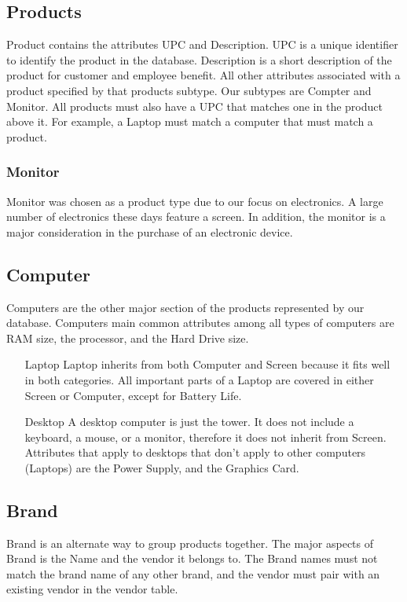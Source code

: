 \documentclass{article}
\begin{document}
		\subsection{Products}
			Product contains the attributes UPC and Description. UPC is a unique
			identifier to identify the product in the database. Description is a short
			description of the product for customer and employee benefit. All other
			attributes associated with a product specified by that products subtype.
			Our subtypes are Compter and Monitor. All products must also have a UPC that 
			matches one in the product above it. For example, a Laptop must match a 
			computer that must match a product.

			\subsubsection{Monitor}
				Monitor was chosen as a product type due to our focus on electronics.  A
				large number of electronics these days feature a screen. In addition, the
				monitor is a major consideration in the purchase of an electronic device.

			\subsection{Computer}
				Computers are the other major section of the products represented by our
				database. Computers main common attributes among all types of computers
				are RAM size, the processor, and the Hard Drive size. 
				\begin{itemize}
				
					\item [Laptop] Laptop inherits from both Computer and Screen because 
					it fits well in both categories. All important parts of a Laptop are 
					covered in either Screen or Computer, except for Battery Life.
					
					\item [Desktop]  A desktop computer is just the tower. It does not 
					include a keyboard, a mouse, or a monitor, therefore it does not 
					inherit from Screen. Attributes that apply to desktops that don't apply 
					to other computers (Laptops) are the Power Supply, and the Graphics Card.
					
				\end{itemize}

		\subsection{Brand}
			Brand is an alternate way to group products together. The major aspects of
			Brand is the Name and the vendor it belongs to. The Brand names must not 
			match the brand name of any other brand, and the vendor must pair with 
			an existing vendor in the vendor table. 
\end{document}
